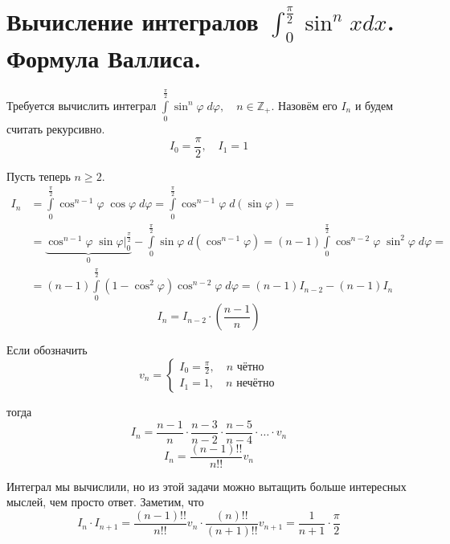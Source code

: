 \documentclass[../main.tex]{subfiles}
\begin{document}
\newpage
\section{Вычисление интегралов \( \int_{ 0}^{ \frac{ \pi}{ 2}} \sin^n xdx\). Формула Валлиса.}
Требуется вычислить интеграл \( \displaystyle\int\limits_{ 0}^{ \frac{ \pi}{ 2}} \sin^n \varphi \;d \varphi ,\quad n \in \mathbb{Z}_+\). Назовём его \( I_n\) и будем считать рекурсивно. 
\[ I_0= \dfrac{ \pi}{ 2} ,\quad I_1=1\]

Пусть теперь \( n \geq 2\).
\begin{equation*}
    \begin{aligned}
        I_n&= \displaystyle\int\limits_{ 0}^{ \frac{ \pi}{ 2}  } \cos ^{n-1} \varphi \; \cos \varphi \; d \varphi = \displaystyle\int\limits_{ 0}^{ \frac{ \pi}{ 2}  } \cos ^{n-1} \varphi \; d\left( \sin \varphi \right)=\\
        &=\underbrace{\cos^{n-1} \varphi \; \sin \varphi \bigg|_0^{ \frac{ \pi}{ 2}}}_0 - \displaystyle\int\limits_{ 0}^{ \frac{ \pi}{ 2}  } \sin \varphi \; d\left( \cos ^{n-1} \varphi \right)=\left( n-1\right) \displaystyle\int\limits_{ 0}^{ \frac{ \pi}{ 2}  } \cos ^{n-2} \varphi \; \sin^2 \varphi \;d \varphi =\\ 
        &=\left( n-1\right) \displaystyle\int\limits_{ 0}^{ \frac{ \pi}{ 2}  } \left( 1- \cos^2 \varphi \right)\cos^{n-2} \varphi \; d \varphi = \left( n-1\right) I_{n-2} - \left( n-1\right)I_n
    \end{aligned}
\end{equation*}
\[ \boxed{I_n= I_{n-2} \cdot \left( \dfrac{ n-1}{ n} \right)}\]

Если обозначить
\begin{equation*}
    v_n=
    \begin{cases}
        I_0= \frac{ \pi}{ 2},\quad n\text{ чётно}\\ 
        I_1=1,\quad n\text{ нечётно} 
    \end{cases}
\end{equation*}

тогда 
\[ I_n= \dfrac{ n-1}{ n} \cdot \dfrac{ n-3}{ n-2} \cdot \dfrac{ n-5}{ n-4} \cdot \ldots \cdot v_n\]
\[ \boxed{I_n= \dfrac{ \left(n-1\right)!!}{ n!!} v_n}\]

Интеграл мы вычислили, но из этой задачи можно вытащить больше интересных мыслей, чем просто ответ. Заметим, что
\[ I_n \cdot I_{n+1}= \dfrac{ \left(n-1\right)!!}{ n!!} v_n \cdot \dfrac{ \left(n\right)!!}{ \left( n+1\right)!!} v_{n+1} =  \dfrac{ 1}{ n+1} \cdot  \dfrac{ \pi}{ 2}  \]
\end{document}
